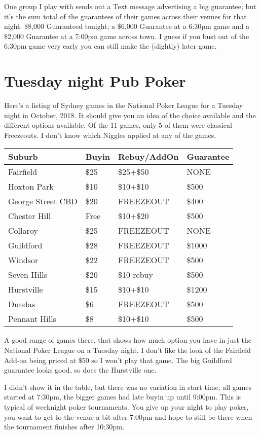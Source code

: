 One group I play with sends out a Text message advertising a big
guarantee; but it's the sum total of the guarantees of their games
across their venues for that night. \$8,000 Guaranteed tonight; a
\$6,000 Guarantee at a 6:30pm game and a \$2,000 Guarantee at
a 7:00pm game across town. I guess if you bust out of the 6:30pm game
very early you can still make the (slightly) later game.

\section{Tuesday night Pub Poker}

Here's a listing of Sydney games in the National Poker League
for a Tuesday night in October, 2018. It should give you an
idea of the choice available and the different options available.
Of the 11 games, only 5 of them were classical Freezeouts.
I don't know which Niggles applied at any of the games.


\begin{tabular}{|l|l|l|l|} \hline
Suburb & Buyin & Rebuy/AddOn & Guarantee \\ \hline
Fairfield        & \$25 & \$25+\$50 & NONE \\ \hline
Hoxton Park       & \$10 & \$10+\$10 & \$500 \\ \hline
George Street CBD & \$20 & FREEZEOUT & \$400 \\ \hline
Chester Hill & Free & \$10+\$20 & \$500 \\ \hline
Collaroy & \$25 & FREEZEOUT & NONE \\ \hline
Guildford & \$28 & FREEZEOUT & \$1000 \\ \hline
Windsor & \$22 & FREEZEOUT & \$500 \\ \hline
Seven Hills & \$20 & \$10 rebuy & \$500 \\ \hline
Hurstville & \$15 & \$10+\$10 & \$1200 \\ \hline
Dundas & \$6 & FREEZEOUT & \$500 \\ \hline
Pennant Hills & \$8 & \$10+\$10 & \$500 \\ \hline
\end{tabular}

A good range of games there, that shows how much option you
have in just the National Poker League on a Tuesday night.
I don't like the look of the Fairfield Add-on being priced at \$50
so I won't play that game. The big Guildford guarantee looks
good, so does the Hurstville one.

I didn't show it in the table, but there was no variation in start
time; all games started at 7:30pm, the bigger games had late buyin
up until 9:00pm. This is typical of weeknight poker
tournaments. You give up your night to play poker,
you want to get to the venue a bit after 7:00pm and hope to still
be there when the tournament finishes after 10:30pm.


